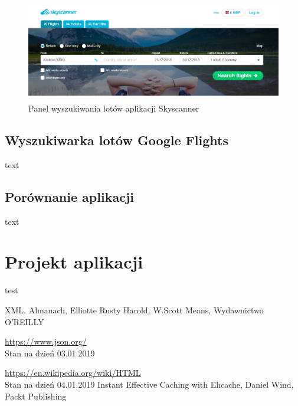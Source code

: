 \documentclass[12pt, twoside]{report}
\begin{document}
 
\newpage
\begin{figure}[!ht]
\centering
\includegraphics[scale=0.50, keepaspectratio]{skyscanner_main.png}
\caption{Panel wyszukiwania lotów aplikacji Skyscanner}
\label{fig:skyscanner_main}
\end{figure}


\newpage
\section{Wyszukiwarka lotów Google Flights}
text
\newpage
\section{Porównanie aplikacji}
text
\newpage

\chapter{Projekt aplikacji}
test
\newpage

\begin{thebibliography}{9}
XML. Almanach, Elliotte Rusty Harold, W.Scott Means, Wydawnictwo O'REILLY

  \url{https://www.json.org/} \\
  Stan na dzień 03.01.2019

	\url{https://en.wikipedia.org/wiki/HTML} \\
	Stan na dzień 04.01.2019
Instant Effective Caching with Ehcache, Daniel Wind, Packt Publishing
\end{thebibliography}
\end{document}
